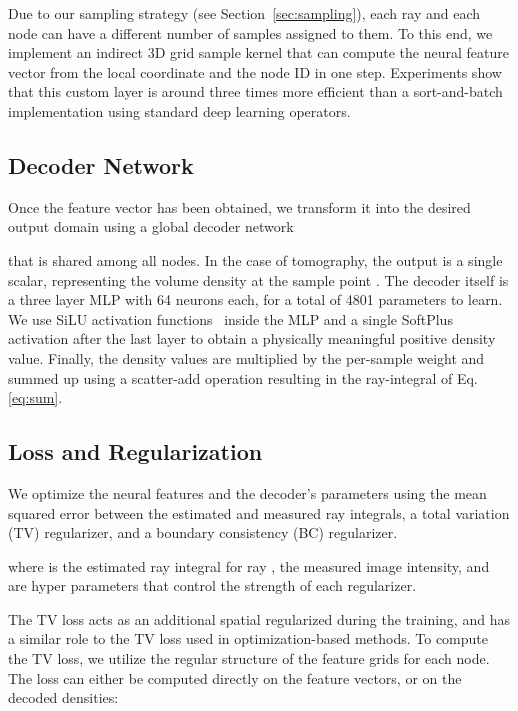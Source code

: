 \documentclass[acmtog,nonacm]{acmart} \acmSubmissionID{0438}
\begin{document}
Due to our sampling strategy (see Section~\ref{sec:sampling}), each ray and each node can have a different number of samples assigned to them.
To this end, we implement an indirect 3D grid sample kernel that can compute the neural feature vector from the local coordinate and the node ID in one step.
Experiments show that this custom layer is around three times more efficient than a sort-and-batch implementation using standard deep learning operators.


\subsection{Decoder Network}
\label{sec:decoder}

Once the feature vector has been obtained, we transform it into the desired output domain using a global decoder network

that is shared among all nodes.
In the case of tomography, the output is a single scalar, representing the volume density  at the sample point .
The decoder itself is a three layer MLP with 64 neurons each, for a total of 4801 parameters to learn.
We use SiLU activation functions~\cite{elfwing2018sigmoid} inside the MLP and a single SoftPlus activation after the last layer to obtain a physically meaningful positive density value.
Finally, the density values are multiplied by the per-sample weight  and summed up using a scatter-add operation resulting in the ray-integral of Eq. \eqref{eq:sum}.


\subsection{Loss and Regularization}
\label{sec:regularizer}

We optimize the neural features and the decoder's parameters using the mean squared error between the estimated and measured ray integrals, a total variation (TV) regularizer, and a boundary consistency (BC) regularizer.

where  is the estimated ray integral for ray ,  the measured image intensity, and  are hyper parameters that control the strength of each regularizer.

The TV loss acts as an additional spatial regularized during the
training, and has a similar role to the TV loss used in
optimization-based methods. To compute the TV loss, we utilize the
regular structure of the feature grids  for each node. The
loss can either be computed directly on the feature vectors, or on the
decoded densities:
\end{document}
